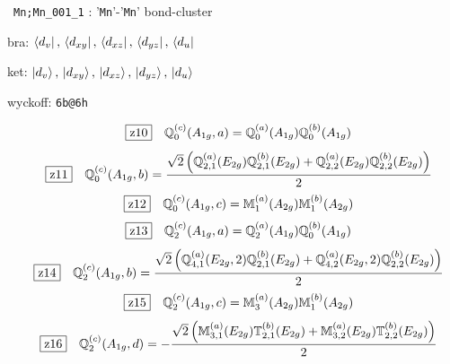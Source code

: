 \documentclass[fleqn,10pt,landscape]{jsarticle}
\begin{document}
\noindent\textbullet\, \texttt{Mn;Mn_001_1} : '\texttt{Mn}'-'\texttt{Mn}' bond-cluster

\noindent\quad * bra: $\bra{d_{v}},\, \bra{d_{xy}},\, \bra{d_{xz}},\, \bra{d_{yz}},\, \bra{d_{u}}$

\noindent\quad * ket: $\ket{d_{v}},\, \ket{d_{xy}},\, \ket{d_{xz}},\, \ket{d_{yz}},\, \ket{d_{u}}$

\noindent\quad * wyckoff: \texttt{6b@6h}

\begin{dmath*}
\hspace*{3mm}\fbox{z10}\quad \mathbb{Q}_{0}^{(c)}(A_{1g},a)=\mathbb{Q}_{0}^{(a)}(A_{1g}) \mathbb{Q}_{0}^{(b)}(A_{1g})
\end{dmath*}
\begin{dmath*}
\hspace*{3mm}\fbox{z11}\quad \mathbb{Q}_{0}^{(c)}(A_{1g},b)=\frac{\sqrt{2} \left(\mathbb{Q}_{2,1}^{(a)}(E_{2g}) \mathbb{Q}_{2,1}^{(b)}(E_{2g}) + \mathbb{Q}_{2,2}^{(a)}(E_{2g}) \mathbb{Q}_{2,2}^{(b)}(E_{2g})\right)}{2}
\end{dmath*}
\begin{dmath*}
\hspace*{3mm}\fbox{z12}\quad \mathbb{Q}_{0}^{(c)}(A_{1g},c)=\mathbb{M}_{1}^{(a)}(A_{2g}) \mathbb{M}_{1}^{(b)}(A_{2g})
\end{dmath*}
\begin{dmath*}
\hspace*{3mm}\fbox{z13}\quad \mathbb{Q}_{2}^{(c)}(A_{1g},a)=\mathbb{Q}_{2}^{(a)}(A_{1g}) \mathbb{Q}_{0}^{(b)}(A_{1g})
\end{dmath*}
\begin{dmath*}
\hspace*{3mm}\fbox{z14}\quad \mathbb{Q}_{2}^{(c)}(A_{1g},b)=\frac{\sqrt{2} \left(\mathbb{Q}_{4,1}^{(a)}(E_{2g},2) \mathbb{Q}_{2,1}^{(b)}(E_{2g}) + \mathbb{Q}_{4,2}^{(a)}(E_{2g},2) \mathbb{Q}_{2,2}^{(b)}(E_{2g})\right)}{2}
\end{dmath*}
\begin{dmath*}
\hspace*{3mm}\fbox{z15}\quad \mathbb{Q}_{2}^{(c)}(A_{1g},c)=\mathbb{M}_{3}^{(a)}(A_{2g}) \mathbb{M}_{1}^{(b)}(A_{2g})
\end{dmath*}
\begin{dmath*}
\hspace*{3mm}\fbox{z16}\quad \mathbb{Q}_{2}^{(c)}(A_{1g},d)=- \frac{\sqrt{2} \left(\mathbb{M}_{3,1}^{(a)}(E_{2g}) \mathbb{T}_{2,1}^{(b)}(E_{2g}) + \mathbb{M}_{3,2}^{(a)}(E_{2g}) \mathbb{T}_{2,2}^{(b)}(E_{2g})\right)}{2}
\end{dmath*}
\end{document}
